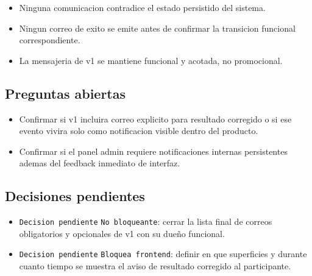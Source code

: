 \begin{itemize}
  \item Ninguna comunicacion contradice el estado persistido del sistema.
  \item Ningun correo de exito se emite antes de confirmar la transicion funcional correspondiente.
  \item La mensajeria de v1 se mantiene funcional y acotada, no promocional.
\end{itemize}

\subsection{Preguntas abiertas}

\begin{itemize}
  \item Confirmar si v1 incluira correo explicito para resultado corregido o si ese evento vivira solo como notificacion visible dentro del producto.
  \item Confirmar si el panel admin requiere notificaciones internas persistentes ademas del feedback inmediato de interfaz.
\end{itemize}

\subsection{Decisiones pendientes}

\begin{itemize}
  \item \texttt{Decision pendiente} \texttt{No bloqueante}: cerrar la lista final de correos obligatorios y opcionales de v1 con su due\~no funcional.
  \item \texttt{Decision pendiente} \texttt{Bloquea frontend}: definir en que superficies y durante cuanto tiempo se muestra el aviso de resultado corregido al participante.
\end{itemize}
